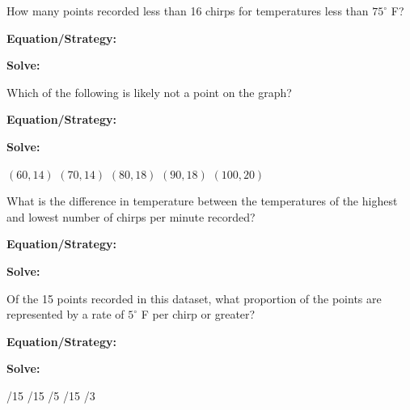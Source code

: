 \begin{multicols*}{2}
\begin{outline}[enumerate]
\medium

\1 How many points recorded less than 16 chirps for temperatures less than $75^\circ$ F?

\bigskip
\textbf{Equation/Strategy:} \hrulefill

\bigskip
\textbf{Solve:}

\vfill
{}

\midline

\1 Which of the following is likely not a point on the graph?

\bigskip
\textbf{Equation/Strategy:} \hrulefill

\bigskip
\textbf{Solve:}

\vfill
\2 $(60,14)$
\2 $(70,14)$
\2 $(80,18)$
\2 $(90,18)$
\2 $(100,20)$

\columnbreak
\advanced

\1 What is the difference in temperature between the temperatures of the highest and lowest number of chirps per minute recorded?

\bigskip
\textbf{Equation/Strategy:}

\bigskip
\textbf{Solve:}

\vfill
{}

\midline

\1 Of the 15 points recorded in this dataset, what proportion of the points are represented by a rate of $5^\circ$ F per chirp or greater?

\bigskip
\textbf{Equation/Strategy:} \hrulefill

\bigskip
\textbf{Solve:}

\vfill
{}/15
/15
/5
/15
/3
\end{outline}
\end{multicols*}